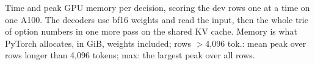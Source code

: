 \begin{table}[t]
  \centering\small
  \caption{Time and peak GPU memory per decision, scoring the dev rows one at a time on one A100. The decoders
  use bf16 weights and read the input, then the whole trie of option numbers in one more pass on the shared KV cache.
  Memory is what PyTorch allocates, in GiB, weights included; rows $>$4{,}096 tok.: mean peak over rows longer than
  4{,}096 tokens; max: the largest peak over all rows.}
  \label{tab:memory}
  
\end{table}

